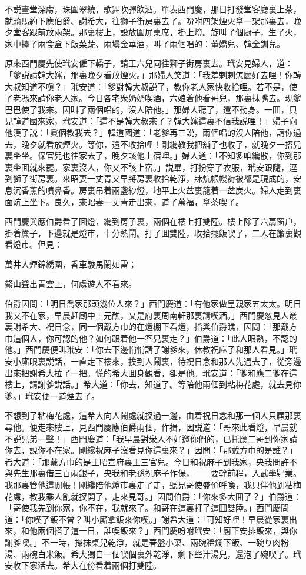 不説畫堂深䖏，珠圍翠繞，歌舞吹彈飲酒。單表西門慶，那日打發堂客廳裏上茶，就騎馬約下應伯爵、謝希大，往獅子街房裏去了。吩咐四架煙火拿一架那裏去，晚夕堂客跟前放兩架。那裏樓上，設放圍屏桌席，掛上燈。旋叫了個廚子，生了火，家中擡了兩食盒下飯菜蔬、兩壜金華酒，叫了兩個唱的：董嬌兒、韓金釧兒。

原來西門慶先使玳安僱下轎子，請王六兒同往獅子街房裏去。玳安見婦人，道：「爹説請韓大嬸，那裏晚夕看放煙火。」那婦人笑道：「我羞剌剌怎麽好去哩！你韓大叔知道不嗔？」玳安道：「爹對韓大叔説了，教你老人家快收拾哩。若不是，使了老馮來請你老人家。今日各宅衆奶奶喫酒，六娘着他看哥兒，那裏抹嘴去。現爹巴巴使了我來。因叫了兩個唱的，沒人陪他。」那婦人聽了，還不動身。一囬，只見韓道國來家，玳安道：「這不是韓大叔來了？韓大嬸這裏不信我説哩！」婦子向他漢子説：「眞個教我去？」韓道國道：「老爹再三説，兩個唱的沒人陪他，請你過去，晚夕就看放煙火。等你，還不收拾哩！剛纔教我把舖子也收了，就晚夕一搭兒裏坐坐。保官兒也往家去了，晚夕該他上宿哩。」婦人道：「不知多咱纔散，你到那裏坐囬就來罷。家裏沒人，你又不該上宿。」説畢，打扮穿了衣服，玳安跟隨，逕到獅子街房裏。來昭妻一丈青又早將房裏收拾乾淨，牀炕帳幔褥被都是現成的，安息沉香薰的噴鼻香。房裏吊着兩盞紗燈，地平上火盆裏籠着一盆炭火。婦人走到裏面炕上坐下。良久，來昭妻一丈青走出來，道了萬福，拿茶喫了。

西門慶與應伯爵看了囬燈，纔到房子裏，兩個在樓上打雙陸。樓上除了六扇窗户，掛着簾子，下邊就是燈市，十分熱鬧。打了囬雙陸，收拾擺飯喫了，二人在簾裏觀看燈市。但見：
\begin{myquote}
萬井人煙錦綉圍，香車駿馬鬧如雷；

鰲山聳出青雲上，何䖏遊人不看來。
\end{myquote}

伯爵因問：「明日喬家那頭幾位人來？」西門慶道：「有他家做皇親家五太太。明日我又不在家，早晨赶廟中上元醮，又是府裏周南軒那裏請喫酒。」西門慶忽見人叢裏謝希大、祝日念，同一個戴方巾的在燈棚下看燈，指與伯爵瞧，因問：「那戴方巾這個人，你可認的他？如何跟着他一答兒裏走？」伯爵道：「此人眼熟，不認的他。」西門慶便叫玳安：「你去下邊悄悄請了謝爹來，休教祝麻子和那人看見。」玳安小廝眼裏説話，一直走下樓來，挨到人鬧裏，待祝日念和那人先過去了，從旁邊出來把謝希大拉了一把。慌的希大囬身觀看，卻是他。玳安道：「爹和應二爹在這樓上，請謝爹説話。」希大道：「你去，知道了。等陪他兩個到粘梅花處，就去見你爹。」玳安便一道煙去了。

不想到了粘梅花處，這希大向人鬧處就扠過一邊，由着祝日念和那一個人只顧那裏尋他。便走來樓上，見西門慶應伯爵兩個，作揖，因説道：「哥來此看燈，早晨就不説兄弟一聲！」西門慶道：「我早晨對衆人不好邀你們的，已托應二哥到你家請你去，說你不在家。剛纔祝麻子沒看見你這裏來？」因問：「那戴方巾的是誰？」希大道：「那戴方巾的是王昭宣府裏王三官兒。今日和祝麻子到我家，央我問許不與先生那裏借三百兩銀子，央我和老孫祝麻子作保，——要幹前程，入武學肄業。我那裏管他這閒帳！剛纔陪他燈市裏走了走，聽見哥使盛价呼喚，我只伴他到粘梅花䖏，教我乘人亂就扠開了，走來見哥。」因問伯爵：「你來多大囬了？」伯爵道：「哥使我先到你家，你不在，我就來了。和哥在這裏打了這囬雙陸。」西門慶問道：「你喫了飯不曾？叫小廝拿飯來你喫。」謝希大道：「可知好哩！早晨從家裏出來，和他兩個搭了這一日，誰喫飯來？」西門慶吩咐玳安：「廚下安排飯來，與你謝爹喫。」不一時，搽抹桌兒乾淨，就是春盤小菜、兩碗稀爛下飯、一碗り肉粉湯、兩碗白米飯。希大獨自一個喫個裏外乾淨，剩下些汁湯兒，還泡了碗喫了。玳安收下家活去。希大在傍看着兩個打雙陸。

